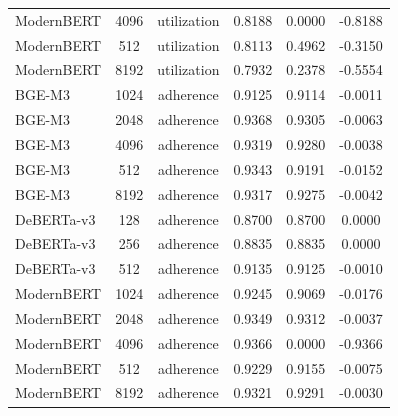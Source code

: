 \begin{table}
\begin{tabular}{lccccc}
ModernBERT & 4096 & utilization & 0.8188 & 0.0000 & -0.8188 \\
ModernBERT & 512 & utilization & 0.8113 & 0.4962 & -0.3150 \\
ModernBERT & 8192 & utilization & 0.7932 & 0.2378 & -0.5554 \\
BGE-M3 & 1024 & adherence & 0.9125 & 0.9114 & -0.0011 \\
BGE-M3 & 2048 & adherence & 0.9368 & 0.9305 & -0.0063 \\
BGE-M3 & 4096 & adherence & 0.9319 & 0.9280 & -0.0038 \\
BGE-M3 & 512 & adherence & 0.9343 & 0.9191 & -0.0152 \\
BGE-M3 & 8192 & adherence & 0.9317 & 0.9275 & -0.0042 \\
DeBERTa-v3 & 128 & adherence & 0.8700 & 0.8700 & 0.0000 \\
DeBERTa-v3 & 256 & adherence & 0.8835 & 0.8835 & 0.0000 \\
DeBERTa-v3 & 512 & adherence & 0.9135 & 0.9125 & -0.0010 \\
ModernBERT & 1024 & adherence & 0.9245 & 0.9069 & -0.0176 \\
ModernBERT & 2048 & adherence & 0.9349 & 0.9312 & -0.0037 \\
ModernBERT & 4096 & adherence & 0.9366 & 0.0000 & -0.9366 \\
ModernBERT & 512 & adherence & 0.9229 & 0.9155 & -0.0075 \\
ModernBERT & 8192 & adherence & 0.9321 & 0.9291 & -0.0030 \\
\bottomrule
\end{tabular}
\end{table}
